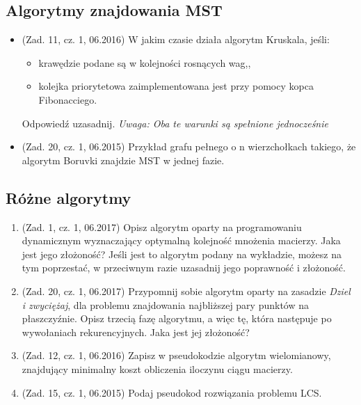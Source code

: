\documentclass[10pt]{article}%
\begin{document}
\subsection*{Algorytmy znajdowania MST}
\begin{itemize}

\item (Zad. 11, cz. 1, 06.2016) W jakim czasie działa algorytm Kruskala, jeśli:
\begin{itemize}
	\item krawędzie podane są w kolejności rosnących wag,,
	\item kolejka priorytetowa zaimplementowana jest przy pomocy kopca Fibonacciego.
\end{itemize}
Odpowiedź uzasadnij. \textit{Uwaga: Oba te warunki są spełnione jednocześnie}

\item (Zad. 20, cz. 1, 06.2015) Przykład grafu pełnego o n wierzchołkach takiego, że algorytm Boruvki znajdzie MST w jednej fazie.

\end{itemize}


\subsection*{Różne algorytmy}

\begin{enumerate}

\item(Zad. 1, cz. 1, 06.2017)
Opisz algorytm oparty na programowaniu dynamicznym wyznaczający optymalną kolejność mnożenia macierzy. Jaka jest jego złożoność? Jeśli jest to algorytm podany na wykładzie, możesz na tym poprzestać, w przeciwnym razie uzasadnij jego poprawność i złożoność.

\item (Zad. 20, cz. 1, 06.2017) Przypomnij sobie algorytm oparty na zasadzie \emph{Dziel i zwyciężaj}, dla problemu znajdowania najbliższej pary punktów na płaszczyźnie. Opisz trzecią fazę algorytmu, a więc tę, która następuje po wywołaniach rekurencyjnych. Jaka jest jej złożoność?

\item (Zad. 12, cz. 1, 06.2016) Zapisz w pseudokodzie algorytm wielomianowy, znajdujący minimalny koszt obliczenia iloczynu ciągu macierzy.

\item (Zad. 15, cz. 1, 06.2015) Podaj pseudokod rozwiązania problemu LCS.

\end{enumerate}
\end{document}
